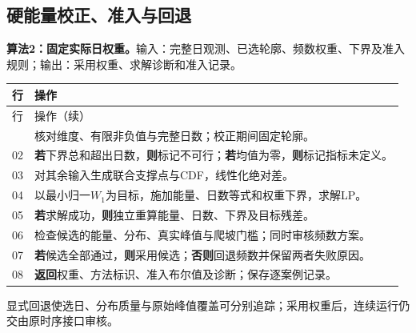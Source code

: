 \subsection{硬能量校正、准入与回退}
\noindent\textbf{算法2：固定实际日权重。}输入：完整日观测、已选轮廓、频数权重、下界及准入规则；输出：采用权重、求解诊断和准入记录。
\begin{longtable}{@{}p{}p{}@{}}
\toprule 行 & 操作\\\midrule
\endfirsthead
\toprule 行 & 操作（续）\\\midrule
\endhead
\bottomrule\endfoot
01 & 核对维度、有限非负值与完整日数；校正期间固定轮廓。\\
02 & \textbf{若}下界总和超出日数，\textbf{则}标记不可行；\textbf{若}均值为零，\textbf{则}标记指标未定义。\\
03 & 对其余输入生成联合支撑点与CDF，线性化绝对差。\\
04 & 以最小归一$W_1$为目标，施加能量、日数等式和权重下界，求解LP。\\
05 & \textbf{若}求解成功，\textbf{则}独立重算能量、日数、下界及目标残差。\\
06 & 检查候选的能量、分布、真实峰值与爬坡门槛；同时审核频数方案。\\
07 & \textbf{若}候选全部通过，\textbf{则}采用候选；\textbf{否则}回退频数并保留两者失败原因。\\
08 & \textbf{返回}权重、方法标识、准入布尔值及诊断；保存逐案例记录。\\
\end{longtable}
显式回退使选日、分布质量与原始峰值覆盖可分别追踪；采用权重后，连续运行仍交由原时序接口审核。

